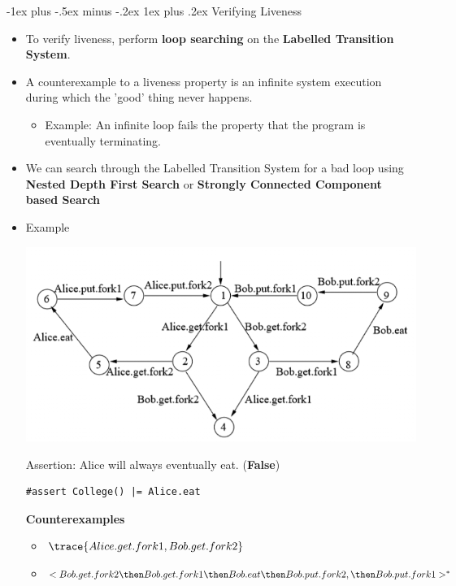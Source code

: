 \documentclass[10pt, landscape]{article}
\makeatletter
\renewcommand{\subsubsection}{\@startsection{subsubsection}{3}{0mm}%
  {-1ex plus -.5ex minus -.2ex}%
  {1ex plus .2ex}%
{\normalfont\small\bfseries}}%
\makeatother
\begin{document}
\begin{multicols*}{3}
  \subsubsection{Verifying Liveness}
  \begin{itemize}
    \item To verify liveness, perform \textbf{loop searching} on the \textbf{Labelled Transition System}.
    \item A counterexample to a liveness property is an infinite system execution during which the 'good' thing never happens.
    \begin{itemize}
        \item Example: An infinite loop fails the property that the program is eventually terminating.
    \end{itemize}
    \item We can search through the Labelled Transition System for a bad loop using \textbf{Nested Depth First Search} or \textbf{Strongly Connected Component based Search}
    \item Example
    \begin{center}
        \includegraphics[scale=0.18]{../images/DiningPhilosophers.png}
    \end{center}
    Assertion: Alice will always eventually eat. (\textbf{False})
\begin{lstlisting}
#assert College() |= Alice.eat
\end{lstlisting}
    \textbf{Counterexamples}
    \begin{itemize}
        \item $\trace{Alice.get.fork1, Bob.get.fork2}$
        \item $<Bob.get.fork2 \then Bob.get.fork1 \then Bob.eat \then Bob.put.fork2, \then Bob.put.fork1>^{*}$
    \end{itemize}
  \end{itemize} 


\end{multicols*}
\end{document}
